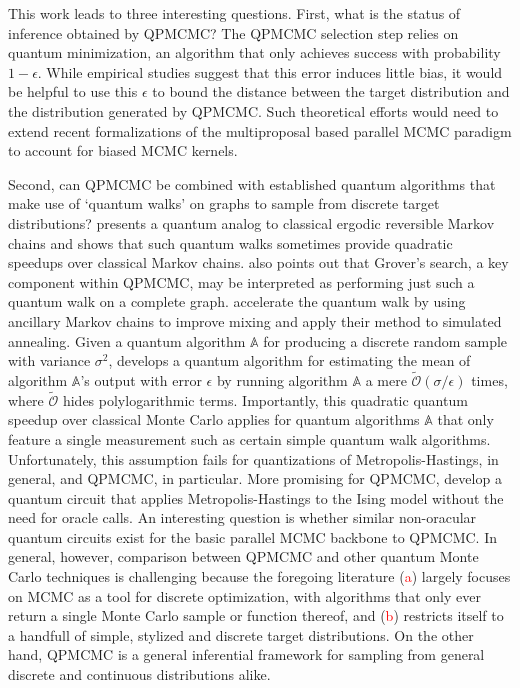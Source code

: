 \documentclass[12pt]{article} %
\begin{document}
This work leads to three interesting questions.   First, what is the status of inference obtained by QPMCMC?  The QPMCMC selection step relies on quantum minimization, an algorithm that only achieves success with probability $1-\epsilon$.  While empirical studies suggest that this error induces little bias, it would be helpful to use this $\epsilon$ to bound the distance between the target distribution and the distribution generated by QPMCMC.  Such theoretical efforts would need to extend recent formalizations of the multiproposal based parallel MCMC paradigm \citep{glatt} to account for biased MCMC kernels.

Second, can QPMCMC be combined with established quantum algorithms that make use of `quantum walks' on graphs to sample from discrete target distributions?  \citet{szegedy2004quantum} presents a quantum analog to classical ergodic reversible Markov chains and shows that such quantum walks sometimes provide quadratic speedups over classical Markov chains.  \citet{szegedy2004quantum} also points out that Grover's search, a key component within QPMCMC, may be interpreted as performing just such a quantum walk on a complete graph.  \citet{wocjan2008speedup} accelerate the quantum walk by using ancillary Markov chains to improve mixing and apply their method to simulated annealing.  Given a quantum algorithm $\mathbb{A}$ for producing a discrete random sample with variance $\sigma^2$, \citet{montanaro} develops a quantum algorithm for estimating the mean of algorithm $\mathbb{A}$'s output with error $\epsilon$ by running algorithm $\mathbb{A}$ a mere $\widetilde{\mathcal{O}}(\sigma/\epsilon)$ times, where $\widetilde{\mathcal{O}}$ hides polylogarithmic terms. Importantly, this quadratic quantum speedup over classical Monte Carlo applies for quantum algorithms $\mathbb{A}$ that only feature a single measurement such as certain simple quantum walk algorithms. Unfortunately, this assumption fails for quantizations of Metropolis-Hastings, in general, and QPMCMC, in particular. More promising for QPMCMC, \citet{lemieux2020efficient} develop a quantum circuit that applies Metropolis-Hastings to the Ising model without the need for oracle calls.  An interesting question is whether similar non-oracular quantum circuits exist for the basic parallel MCMC backbone to QPMCMC.  In general, however, comparison between QPMCMC and other quantum Monte Carlo techniques is challenging because the foregoing literature (\textcolor{red}{a}) largely focuses on MCMC as a tool for discrete optimization, with algorithms that only ever return a single Monte Carlo sample or function thereof, and (\textcolor{red}{b}) restricts itself to a handfull of simple, stylized and discrete target distributions.  On the other hand, QPMCMC is a general inferential framework for sampling from general discrete and continuous distributions alike.
\end{document}
